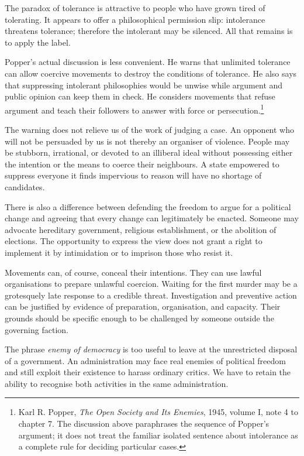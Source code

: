 \documentclass[12pt,a4paper]{book}
\begin{document}
The paradox of tolerance is attractive to people who have grown tired of tolerating. It appears to offer a philosophical permission slip: intolerance threatens tolerance; therefore the intolerant may be silenced. All that remains is to apply the label.

Popper's actual discussion is less convenient. He warns that unlimited tolerance can allow coercive movements to destroy the conditions of tolerance. He also says that suppressing intolerant philosophies would be unwise while argument and public opinion can keep them in check. He considers movements that refuse argument and teach their followers to answer with force or persecution.\footnote{Karl R. Popper, \emph{The Open Society and Its Enemies}, 1945, volume I, note 4 to chapter 7. The discussion above paraphrases the sequence of Popper's argument; it does not treat the familiar isolated sentence about intolerance as a complete rule for deciding particular cases.}

The warning does not relieve us of the work of judging a case. An opponent who will not be persuaded by us is not thereby an organiser of violence. People may be stubborn, irrational, or devoted to an illiberal ideal without possessing either the intention or the means to coerce their neighbours. A state empowered to suppress everyone it finds impervious to reason will have no shortage of candidates.

There is also a difference between defending the freedom to argue for a political change and agreeing that every change can legitimately be enacted. Someone may advocate hereditary government, religious establishment, or the abolition of elections. The opportunity to express the view does not grant a right to implement it by intimidation or to imprison those who resist it.

Movements can, of course, conceal their intentions. They can use lawful organisations to prepare unlawful coercion. Waiting for the first murder may be a grotesquely late response to a credible threat. Investigation and preventive action can be justified by evidence of preparation, organisation, and capacity. Their grounds should be specific enough to be challenged by someone outside the governing faction.

The phrase \emph{enemy of democracy} is too useful to leave at the unrestricted disposal of a government. An administration may face real enemies of political freedom and still exploit their existence to harass ordinary critics. We have to retain the ability to recognise both activities in the same administration.
\end{document}
